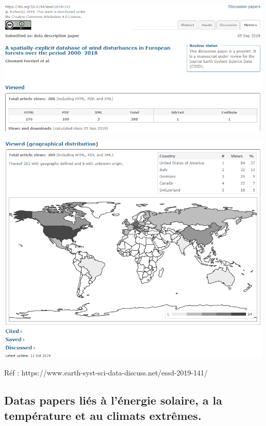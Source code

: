 \documentclass[11pt,oneside]{article}
\begin{document}
\begin{flushleft}
\includegraphics[scale=0.7]{Wind_disturbances_metrics}
\end{flushleft}

\begin{flushleft}
\includegraphics[scale=0.7]{Wind_disturbances_metrics_2}
\end{flushleft}

\begin{flushleft}
Réf : https://www.earth-syst-sci-data-discuss.net/essd-2019-141/
\end{flushleft}

\newpage

\subsection*{Datas papers liés à l'énergie solaire, a la température et au climats extrêmes.}
\end{document}
